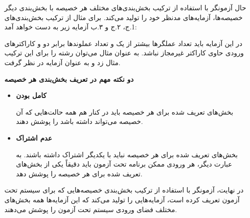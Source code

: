 حال آزمونگر با استفاده از ترکیب بخش‌بندی‌های مختلف هر خصیصه با بخش‌بندی دیگر خصیصه‌ها، آزمایه‌های مدنظر خود را تولید می‌کند. برای مثال از ترکیب بخش‌بندی‌های 1.ج، ۲.ج و ۳.ب آزمایه زیر به دست خواهد آمد:

در این آزمایه باید تعداد عملگرها بیشتر از یک و تعداد عملوند‌ها برابر دو و کاراکترهای ورودی حاوی کاراکتر غیرمجاز نباشد. به عنوان مثال می‌توان رشته  را برای این ترکیب مثال زد و به عنوان آزمایه در نظر گرفت.

\textbf{دو نکته مهم در تعریف بخش‌بندی هر خصیصه}

\begin{itemize}
	\item \textbf{کامل بودن}
	
	بخش‌های تعریف شده برای هر خصیصه باید در کنار هم همه حالت‌هایی که آن خصیصه می‌تواند داشته باشد را پوشش دهند.
	
	\item \textbf{عدم اشتراک}
	
	بخش‌های تعریف شده برای هر خصیصه نباید با یکدیگر اشتراک داشته باشند. به عبارت دیگر، هر ورودی ممکن برنامه تحت آزمون باید دقیقاً یکی از بخش‌های تعریف شده برای هر خصیصه را پوشش دهد.
\end{itemize}

در نهایت، آزمونگر با استفاده از ترکیب بخش‌بندی خصیصه‌هایی که برای سیستم تحت آزمون تعریف کرده است، آزمایه‌هایی را تولید می‌کند که این آزمایه‌ها همه بخش‌های مختلف فضای ورودی سیستم تحت آزمون را پوشش می‌دهند.

